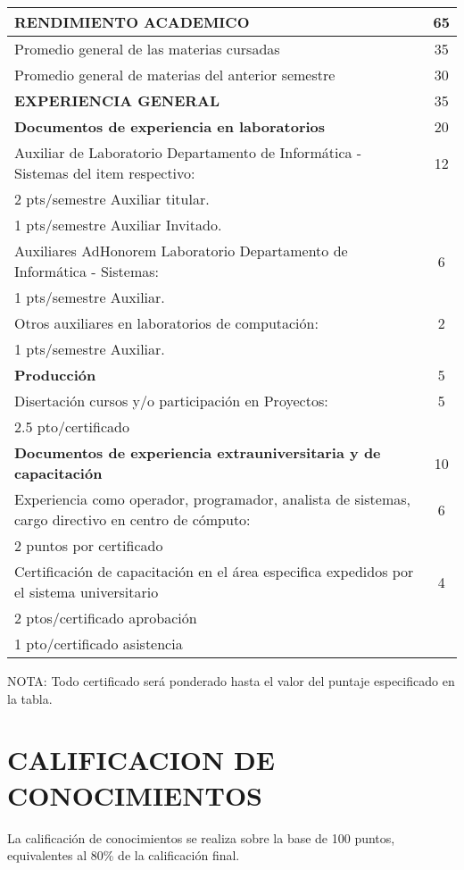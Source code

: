 \documentclass[letterpaper,11pt]{article}
\begin{document}
\begin{tabular}{|p{14cm}|c|}
\hline
 \textbf{RENDIMIENTO ACADEMICO} & 65 \\
\hline
 Promedio general de las materias cursadas & 35 \\
\hline
 Promedio general de materias del anterior semestre & 30 \\
\hline
 \textbf{EXPERIENCIA GENERAL} & 35 \\
\hline
 \textbf{Documentos de experiencia en laboratorios} & 20 \\
\hline
 Auxiliar de Laboratorio Departamento de Informática - Sistemas del item respectivo: & 12 \\
\hline
 2 pts/semestre Auxiliar titular. &  \\
\hline
 1 pts/semestre Auxiliar Invitado. &  \\
\hline
 Auxiliares AdHonorem Laboratorio Departamento de Informática - Sistemas: & 6 \\
\hline
 1 pts/semestre Auxiliar. &  \\
\hline
 Otros auxiliares en laboratorios de computación: & 2 \\
\hline
 1 pts/semestre Auxiliar. &  \\
\hline
 \textbf{Producción} & 5 \\
\hline
 Disertación cursos y/o participación en Proyectos: & 5 \\
\hline
 2.5 pto/certificado &  \\
\hline
 \textbf{Documentos de experiencia extrauniversitaria y de capacitación} & 10 \\
\hline
 Experiencia como operador, programador, analista de sistemas, cargo directivo en centro de cómputo: & 6 \\
\hline
 2 puntos por certificado &  \\
\hline
 Certificación de capacitación en el área especifica expedidos por el sistema universitario & 4 \\
\hline
 2 ptos/certificado aprobación &  \\
\hline
 1 pto/certificado asistencia &  \\
\hline
\end{tabular}

NOTA: Todo certificado será ponderado hasta el valor del puntaje especificado en la tabla.

\section{CALIFICACION DE CONOCIMIENTOS}
La calificación de conocimientos se realiza sobre la base de 100 puntos, equivalentes al 80\% de la calificación final.
\end{document}

